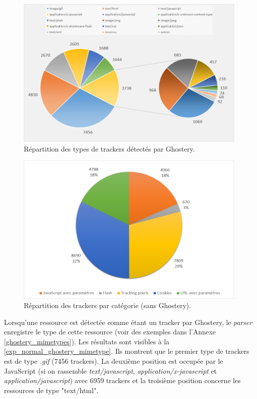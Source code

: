 \begin{figure}[!h]
	\centering
	\includegraphics[scale=.59]{resultats/ANALYSES/Images/Normal-Ghostery-mimetype.png}
	\caption{\label{exp_normal_ghostery_mimetype}Répartition des types de trackers détectés par Ghostery.}
\end{figure}

\begin{figure}[!h]
	\centering
	\includegraphics[scale=.59]{resultats/ANALYSES/Images/Normal-NoG.png}
	\caption{\label{exp_normal_nog}Répartition des trackers par catégorie (sans Ghostery).}
\end{figure}

Lorsqu'une ressource est détectée comme étant un tracker par Ghostery, le \textit{parser} enregistre le type de cette ressource (voir des exemples dans l'Annexe \ref{ghostery_mimetypes}). Les résultats sont visibles à la \autoref{exp_normal_ghostery_mimetype}. Ils montrent que le premier type de trackers est de type \textit{.gif} (7456 trackers). La deuxième position est occupée par le JavaScript (si on rassemble \textit{text/javascript}, \textit{application/x-javascript} et \textit{application/javascript}) avec 6959 trackers et la troisième position concerne les ressources de type "text/html".

